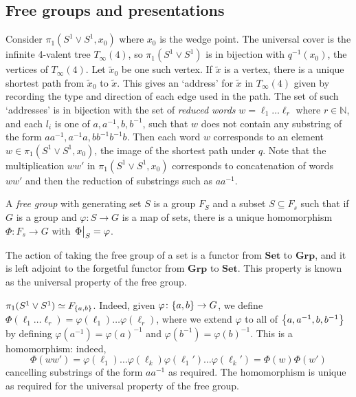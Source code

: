 \subsection{Free groups and presentations}
Consider \( \pi_1(S^1 \vee S^1, x_0) \) where \( x_0 \) is the wedge point.
The universal cover is the infinite 4-valent tree \( T_\infty(4) \), so \( \pi_1(S^1 \vee S^1) \) is in bijection with \( q^{-1}(x_0) \), the vertices of \( T_\infty(4) \).
Let \( \widetilde x_0 \) be one such vertex.
If \( \widetilde x \) is a vertex, there is a unique shortest path from \( \widetilde x_0 \) to \( \widetilde x \).
This gives an `address' for \( \widetilde x \) in \( T_\infty(4) \) given by recording the type and direction of each edge used in the path.
The set of such `addresses' is in bijection with the set of \emph{reduced words} \( w = \ell_1 \dots \ell_r \) where \( r \in \mathbb N \), and each \( l_i \) is one of \( a, a^{-1}, b, b^{-1} \), such that \( w \) does not contain any substring of the form \( aa^{-1}, a^{-1}a, bb^{-1} b^{-1}b \).
Then each word \( w \) corresponds to an element \( w \in \pi_1(S^1 \vee S^1, x_0) \), the image of the shortest path under \( q \).
Note that the multiplication \( ww' \) in \( \pi_1(S^1 \vee S^1, x_0) \) corresponds to concatenation of words \( ww' \) and then the reduction of substrings such as \( aa^{-1} \).
\begin{definition}
    A \emph{free group} with generating set \( S \) is a group \( F_S \) and a subset \( S \subseteq F_s \) such that if \( G \) is a group and \( \varphi \colon S \to G \) is a map of sets, there is a unique homomorphism \( \Phi \colon F_s \to G \) with \( \eval{\Phi}_S = \varphi \).
    \begin{center}
    \end{center}
\end{definition}
\begin{remark}
    The action of taking the free group of a set is a functor from \( \mathbfup{Set} \) to \( \mathbfup{Grp} \), and it is left adjoint to the forgetful functor from \( \mathbfup{Grp} \) to \( \mathbfup{Set} \).
    This property is known as the universal property of the free group.
\end{remark}
\begin{example}
    \( \pi_1(S^1 \vee S^1) \simeq F_{\qty{a,b}} \).
    Indeed, given \( \varphi \colon \qty{a,b} \to G \), we define \( \Phi(\ell_1 \dots \ell_r) = \varphi(\ell_1) \dots \varphi(\ell_r) \), where we extend \( \varphi \) to all of \( \qty{a, a^{-1}, b, b^{-1}} \) by defining \( \varphi(a^{-1}) = \varphi(a)^{-1} \) and \( \varphi(b^{-1}) = \varphi(b)^{-1} \).
    This is a homomorphism: indeed,
	\[ \Phi(ww') = \varphi(\ell_1) \dots \varphi(\ell_k) \varphi(\ell_1') \dots \varphi(\ell_k') = \Phi(w)\Phi(w') \]
	cancelling substrings of the form \( aa^{-1} \) as required.
	The homomorphism is unique as required for the universal property of the free group.
\end{example}
